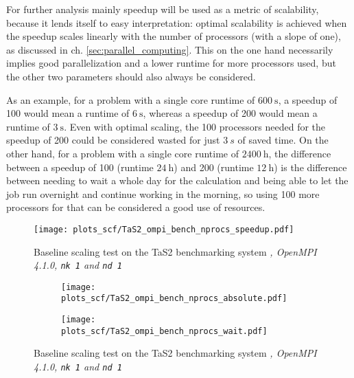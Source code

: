 \documentclass[main.tex]{subfiles}
\begin{document}
For further analysis mainly speedup will be used as a metric of scalability, because it lends itself to easy interpretation: optimal scalability is achieved when the speedup scales linearly with the number of processors (with a slope of one), as discussed in ch. \ref{sec:parallel_computing}.
This on the one hand necessarily implies good parallelization and a lower runtime for more processors used, but the other two parameters should also always be considered.


As an example, for a problem with a single core runtime of \(\SI{600}{\s}\), a speedup of 100 would mean a runtime of \(\SI{6}{\s}\), whereas a speedup of 200 would mean a runtime of \(\SI{3}{\s}\).
Even with optimal scaling, the 100 processors needed for the speedup of 200 could be considered wasted for just \(\SI{3}{s}\) of saved time.
On the other hand, for a problem with a single core runtime of \(\SI{2400}{\hour}\), the difference between a speedup of 100 (runtime \(\SI{24}{\hour}\)) and 200 (runtime \(\SI{12}{\hour}\)) is the difference between needing to wait a whole day for the calculation and being able to let the job run overnight and continue working in the morning, so using 100 more processors for that can be considered a good use of resources. 

\begin{figure}[ht!]
\centering
\texttt{[image: plots\_scf/TaS2\_ompi\_bench\_nprocs\_speedup.pdf]}
\caption{Baseline scaling test on the TaS2 benchmarking system \emph{, OpenMPI 4.1.0, \texttt{nk 1} and \texttt{nd 1}}}
\label{fig:scaling_ompi_nprocs_tas2_speedup}
\end{figure}

\begin{figure}[ht!]
\begin{subfigure}[b]{0.49\textwidth}
    \centering
    \texttt{[image: plots\_scf/TaS2\_ompi\_bench\_nprocs\_absolute.pdf]}
\end{subfigure}
\begin{subfigure}[b]{0.49\textwidth}
    \centering
    \texttt{[image: plots\_scf/TaS2\_ompi\_bench\_nprocs\_wait.pdf]}
\end{subfigure}
\caption{Baseline scaling test on the TaS2 benchmarking system \emph{, OpenMPI 4.1.0, \texttt{nk 1} and \texttt{nd 1}}}
\label{fig:scaling_ompi_nprocs_tas2_absolute_wait}
\end{figure}
\end{document}
